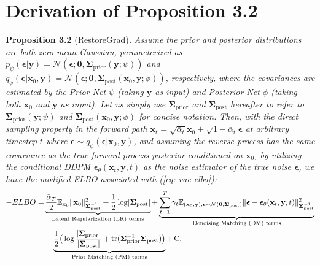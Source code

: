 \section{Derivation of Proposition 3.2}
\label{sec: appendix proof prop 2}
\noindent\textbf{Proposition 3.2} (RestoreGrad)\textbf{.}\textit{
Assume the prior and posterior distributions are both zero-mean Gaussian, parameterized as $p_{\psi}(\boldsymbol{\epsilon}|\mathbf{y})=\mathcal{N}(\boldsymbol{\epsilon};\mathbf{0},\boldsymbol{\Sigma}_{\text{prior}}(\mathbf{y};\psi))$ and $q_{\phi}(\boldsymbol{\epsilon}|\mathbf{x}_0, \mathbf{y})=\mathcal{N}(\boldsymbol{\epsilon};\mathbf{0},\boldsymbol{\Sigma}_{\text{post}}(\mathbf{x}_0,\mathbf{y};\phi))$, respectively, where the covariances are estimated by the Prior Net $\psi$ (taking $\mathbf{y}$ as input) and Posterior Net $\phi$ (taking both $\mathbf{x}_0$ and $\mathbf{y}$ as input). Let us simply use $\boldsymbol{\Sigma}_{\text{prior}}$ and $\boldsymbol{\Sigma}_{\text{post}}$ hereafter to refer to $\boldsymbol{\Sigma}_{\text{prior}}(\mathbf{y};\psi)$ and $\boldsymbol{\Sigma}_{\text{post}}(\mathbf{x}_0,\mathbf{y};\phi)$ for concise notation. 
Then, with the direct sampling property in the forward path $\mathbf{x}_t=\sqrt{\bar{\alpha}_t}\mathbf{x}_0+\sqrt{1-\bar{\alpha}_t}\boldsymbol{\epsilon}$ at arbitrary timestep $t$ where $\boldsymbol{\epsilon}\sim q_{\phi}(\boldsymbol{\epsilon}|\mathbf{x}_0,\mathbf{y})$, and assuming the reverse process has the same covariance as the true forward process posterior conditioned on $\mathbf{x}_0$, by utilizing the conditional DDPM $\boldsymbol{\epsilon}_\theta(\mathbf{x}_t,\mathbf{y},t)$ as the noise estimator of the true noise $\boldsymbol{\epsilon}$, we have the modified ELBO associated with (\ref{eq: vae elbo}): 
\begin{equation*}
\begin{aligned}
    -ELBO  =& \underbrace{\frac{\bar{\alpha}_T}{2}\mathbb{E}_{\mathbf{x}_0}\norm{\mathbf{x}_0}^2_{\boldsymbol{\Sigma}^{-1}_{\text{post}}}+\frac{1}{2}\log\abs{\boldsymbol{\Sigma}_{\text{post}}}}_{\text{Latent Regularization (LR) terms}}
    +\underbrace{\sum_{t=1}^{T}\gamma_t\mathbb{E}_{(\mathbf{x}_0,\mathbf{y}),\boldsymbol{\epsilon}\sim \mathcal{N}(\mathbf{0},\boldsymbol{\Sigma}_{\text{post}})}\norm{\boldsymbol{\epsilon}-\boldsymbol{\epsilon}_\theta(\mathbf{x}_t,\mathbf{y},t)}^2_{\boldsymbol{\Sigma}^{-1}_{\text{post}}}}_{\text{Denoising Matching (DM) terms}} \\
    &+\underbrace{\frac{1}{2}\bigr(\log\frac{\abs{\boldsymbol{\Sigma}_{\text{prior}}}}{\abs{\boldsymbol{\Sigma}_{\text{post}}}}+\text{tr}(\boldsymbol{\Sigma}_{\text{prior}}^{-1}\boldsymbol{\Sigma}_{\text{post}})\bigr)}_{\text{Prior Matching (PM) terms}} + \, \text{C},

\end{aligned}
\end{equation*}}
